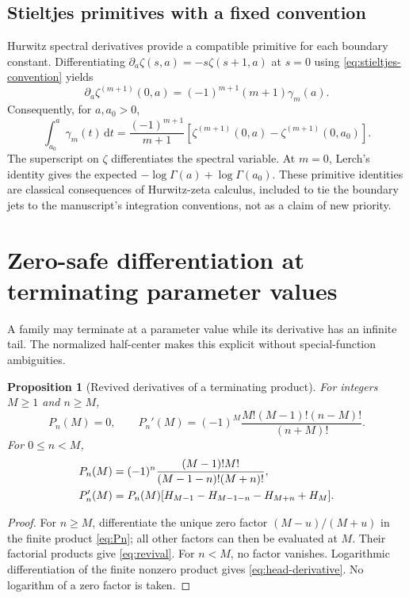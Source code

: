 \documentclass[11pt,a4paper]{article}
\numberwithin{equation}{section}
\newtheorem{proposition}[theorem]{Proposition}
\theoremstyle{definition}\newtheorem{definition}[theorem]{Definition}
\theoremstyle{remark}\newtheorem{remark}[theorem]{Remark}
\newcommand{\dd}{\,\mathrm d}
\begin{document}
\subsection{Stieltjes primitives with a fixed convention}
Hurwitz spectral derivatives provide a compatible primitive for each
boundary constant. Differentiating
$\partial_a\zeta(s,a)=-s\zeta(s+1,a)$ at $s=0$ using
\eqref{eq:stieltjes-convention} yields
\begin{equation}
 \partial_a\zeta^{(m+1)}(0,a)=(-1)^{m+1}(m+1)\gamma_m(a).
 \label{eq:stieltjes-derivative}
\end{equation}
Consequently, for $a,a_0>0$,
\begin{equation}
 \int_{a_0}^a\gamma_m(t)\dd t
 =\frac{(-1)^{m+1}}{m+1}
       [\zeta^{(m+1)}(0,a)-\zeta^{(m+1)}(0,a_0)].
 \label{eq:stieltjes-primitive}
\end{equation}
The superscript on $\zeta$ differentiates the spectral variable.
At $m=0$, Lerch's identity gives the expected
$-\log\Gamma(a)+\log\Gamma(a_0)$. These primitive identities are
classical consequences of Hurwitz-zeta calculus, included to tie the
boundary jets to the manuscript's integration conventions, not as a
claim of new priority.

\section{Zero-safe differentiation at terminating parameter values}
\label{sec:revival}
A family may terminate at a parameter value while its derivative has an
infinite tail. The normalized half-center makes this explicit without
special-function ambiguities.

\begin{proposition}[Revived derivatives of a terminating product]
\label{prop:revival}
For integers $M\ge1$ and $n\ge M$,
\begin{equation}
 P_n(M)=0,\qquad
 P_n'(M)=(-1)^M\frac{M!(M-1)!(n-M)!}{(n+M)!}.
 \label{eq:revival}
\end{equation}
For $0\le n<M$,
\begin{align}
 P_n(M)&=(-1)^n\frac{(M-1)!M!}{(M-1-n)!(M+n)!},\notag\\
 P_n'(M)&=P_n(M)[H_{M-1}-H_{M-1-n}-H_{M+n}+H_M].
 \label{eq:head-derivative}
\end{align}
\end{proposition}
\begin{proof}
For $n\ge M$, differentiate the unique zero factor $(M-u)/(M+u)$
in the finite product \eqref{eq:Pn}; all other factors can then be
evaluated at $M$. Their factorial products give \eqref{eq:revival}.
For $n<M$, no factor vanishes. Logarithmic differentiation of the
finite nonzero product gives \eqref{eq:head-derivative}.
No logarithm of a zero factor is taken.
\end{proof}
\end{document}
